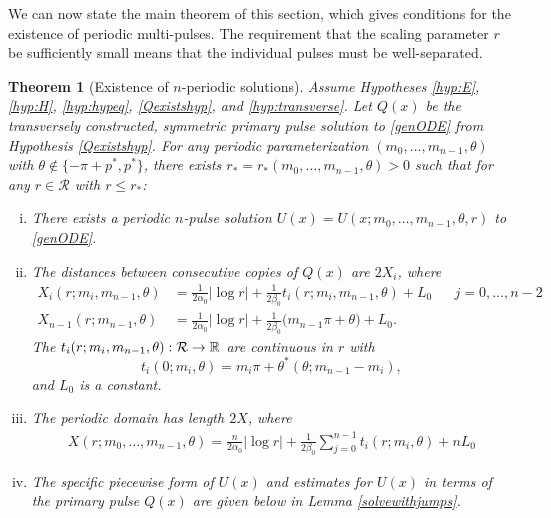 \documentclass[10pt,reqno]{amsart}
\theoremstyle{plain}
\newtheorem{theorem}{Theorem}
\theoremstyle{definition}
\theoremstyle{remark}
\numberwithin{theorem}{section}
\numberwithin{equation}{section}
\begin{document}
We can now state the main theorem of this section, which gives conditions for the existence of periodic multi-pulses. The requirement that the scaling parameter $r$ be sufficiently small means that the individual pulses must be well-separated.

\begin{theorem}[Existence of $n$-periodic solutions]\label{th:perexist}
Assume Hypotheses \ref{hyp:E}, \ref{hyp:H}, \ref{hyp:hypeq}, \ref{Qexistshyp}, and \ref{hyp:transverse}. Let $Q(x)$ be the transversely constructed, symmetric primary pulse solution to \eqref{genODE} from Hypothesis \ref{Qexistshyp}. For any periodic parameterization $(m_0, \dots, m_{n-1}, \theta)$ with $\theta \notin \{-\pi + p^*, p^* \}$, there exists $r_* = r_*(m_0, \dots, m_{n-1}, \theta) > 0$ such that for any $r \in \mathcal{R}$ with $r \leq r_*$:
\begin{enumerate}[(i)]
	\item There exists a periodic $n$-pulse solution $U(x) = U(x; m_0, \dots, m_{n-1}, \theta, r)$ to \eqref{genODE}.

	\item The distances between consecutive copies of $Q(x)$ are $2X_i$, where
	\begin{align}\label{Xi}
		X_i(r; m_i, m_{n-1},\theta) &= \frac{1}{2 \alpha_0} |\log r| + \frac{1}{2\beta_0} t_i(r; m_i,m_{n-1}, \theta) + L_0 && j = 0, \dots, n-2 \\
		X_{n-1}(r; m_{n-1}, \theta) &= \frac{1}{2 \alpha_0} |\log r| + \frac{1}{2 \beta_0}\big( m_{n-1}\pi + \theta \big) + L_0.
	\end{align}
	The $t_i(r; m_i, m_{n-1}, \theta): \mathcal{R} \rightarrow \mathbb{R}$ are continuous in $r$ with 
	\[
	t_i(0; m_i, \theta) = m_i \pi + \theta^*(\theta; m_{n-1} - m_i),
	\]
	and $L_0$ is a constant.

	\item The periodic domain has length $2X$, where
	\begin{align}\label{Xdomain}
	X(r; m_0, \dots, m_{n-1}, \theta) = \frac{n}{2\alpha_0} |\log r| + \frac{1}{2\beta_0} \sum_{j=0}^{n-1} t_i(r; m_i, \theta) + n L_0
	\end{align}

	\item The specific piecewise form of $U(x)$ and estimates for $U(x)$ in terms of the primary pulse $Q(x)$ are given below in Lemma \ref{solvewithjumps}.
\end{enumerate}
\end{theorem}
\end{document}
